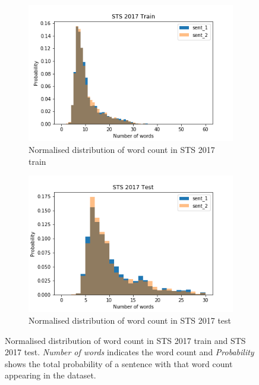 \begin{enumerate}
\begin{figure}
	\captionsetup[subfigure]{justification=centering}
	\centering
	\begin{subfigure}[b]{.5\textwidth}
		\centering
		\includegraphics[width=\textwidth]{figures/semantic_textual_similarity/introduction/sts_2017_train_words.png}
		\caption{Normalised distribution of word count in STS 2017 train}
		\label{fig:sts_train_words}
	\end{subfigure}%
	\begin{subfigure}[b]{.5\textwidth}
		\centering
		\includegraphics[width=\textwidth]{figures/semantic_textual_similarity/introduction/sts_2017_test_words.png}
		\caption{Normalised distribution of word count in STS 2017 test}
		\label{fig:sts_test_words}
	\end{subfigure}
	\caption[Normalised distribution of word count in STS 2017 train and STS 2017 test.]{Normalised distribution of word count in STS 2017 train and STS 2017 test. \textit{Number of words} indicates the word count and \textit{Probability} shows the total probability of a sentence with that word count appearing in the dataset.}
	\label{fig:sts_words}
\end{figure}


\end{enumerate}
